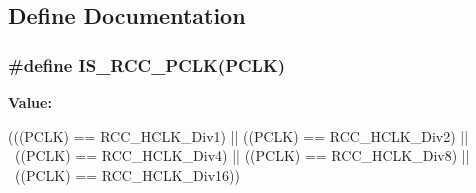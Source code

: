 \subsection{Define Documentation}
\hypertarget{group__APB1__APB2__clock__source_gab70f1257ea47c1da4def8e351af4d9f2}{
\subsubsection[{IS\_\-RCC\_\-PCLK}]{\setlength{\rightskip}{0pt plus 5cm}\#define IS\_\-RCC\_\-PCLK(PCLK)}}
\label{group__APB1__APB2__clock__source_gab70f1257ea47c1da4def8e351af4d9f2}
{\bfseries Value:}
\begin{DoxyCode}
(((PCLK) == RCC_HCLK_Div1) || ((PCLK) == RCC_HCLK_Div2) || \
                           ((PCLK) == RCC_HCLK_Div4) || ((PCLK) == RCC_HCLK_Div8)
       || \
                           ((PCLK) == RCC_HCLK_Div16))
\end{DoxyCode}
